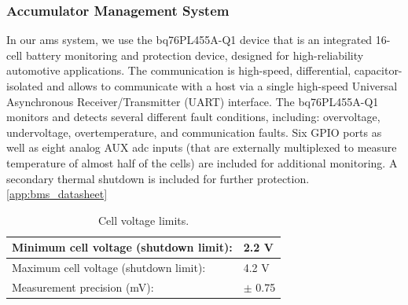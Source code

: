 \subsubsection{Accumulator Management System}\label{subsec:ams}

In our \gls{ams} system, we use the bq76PL455A-Q1 device that is an integrated 16-cell battery monitoring and protection device, designed for high-reliability automotive applications. The communication is high-speed, differential, capacitor-isolated and allows to communicate with a host via a single high-speed Universal Asynchronous Receiver/Transmitter (UART) interface.
The bq76PL455A-Q1 monitors and detects several different fault conditions, including: overvoltage, undervoltage, overtemperature, and communication faults. Six GPIO ports as well as eight analog AUX \gls{adc} inputs (that are externally multiplexed to measure temperature of almost half of the cells) are included for additional monitoring. A secondary thermal shutdown is included for further protection. \ref{app:bms_datasheet}

\begin{table}[H]
	\centering
	\caption{Cell voltage limits.}
	\begin{tabu}{|X|X|}
		\hline
		Minimum cell voltage (shutdown limit): & 2.2 V \\
		\hline
		Maximum cell voltage (shutdown limit): & 4.2 V \\
		\hline
		Measurement precision (mV): & $\pm$ 0.75 \\
		\hline
	\end{tabu}%
	\label{tab:acc-limits}%
\end{table}%


